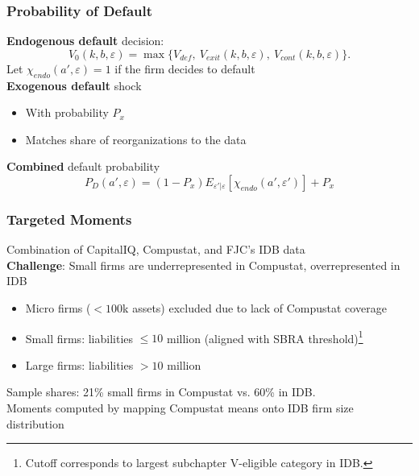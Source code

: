 \documentclass[aspectratio=169,xcolor=table]{beamer}
\begin{document}
\begin{frame}[label=Default] \frametitle{Probability of Default \hfill \hyperlink{LiqReorg}{}}
\textbf{Endogenous default} decision:
\begin{equation*} \label{eq:default decision}
    V_0(k,b,\varepsilon) = \max \{V_{def}, \  V_{exit}(k,b,\varepsilon),  \ V_{cont}(k,b,\varepsilon) \}.
\end{equation*}
Let $\chi_{endo}(a', \varepsilon) = 1$ if the firm decides to default \vspace{3mm} \\

\textbf{Exogenous default} shock 
\begin{itemize} \small
    \item With probability $P_{x}$
    \item Matches share of reorganizations to the data
\end{itemize} \normalsize

\textbf{Combined} default probability 
$$  P_D(a', \varepsilon) = (1-P_x)E_{\varepsilon'|\varepsilon}[\chi_{endo}(a',\varepsilon')] + P_{x}  $$


\end{frame}


\begin{frame}[label=targets] \frametitle{Targeted Moments \hfill \hyperlink{datasources}{}}
 
Combination of CapitalIQ, Compustat, and FJC's IDB data \vspace{3mm} \\
\textbf{Challenge}: Small firms are underrepresented in Compustat, overrepresented in IDB
\begin{itemize}
    \item Micro firms ($<100$k assets) excluded due to lack of Compustat coverage
    \item Small firms: liabilities $\leq 10$ million (aligned with SBRA threshold)\footnote{Cutoff corresponds to largest subchapter V-eligible category in IDB.}
    \item Large firms: liabilities $ > 10$ million
\end{itemize}
Sample shares: 21\% small firms in Compustat vs. 60\% in IDB. \vspace{3mm} \\
Moments computed by mapping Compustat means onto IDB firm size distribution


\end{frame}
\end{document}
